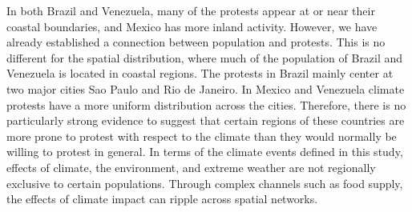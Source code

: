 \documentclass[9pt,twocolumn,twoside]{pnas-new}
\begin{document}
In both Brazil and Venezuela, many of the protests appear at or near their coastal boundaries, and Mexico has more inland activity.
However, we have already established a connection between population and protests.
This is no different for the spatial distribution, where much of the population of Brazil and Venezuela is located in coastal regions.
The protests in Brazil mainly center at two major cities Sao Paulo and Rio de Janeiro.
In Mexico and Venezuela climate protests have a more uniform distribution across the cities.
Therefore, there is no particularly strong evidence to suggest that certain regions of these countries are more prone to protest with respect to the climate than they would normally be willing to protest in general.
In terms of the climate events defined in this study, effects of climate, the environment, and extreme weather are not regionally exclusive to certain populations.
Through complex channels such as food supply, the effects of climate impact can ripple across spatial networks.


%
\end{document}
